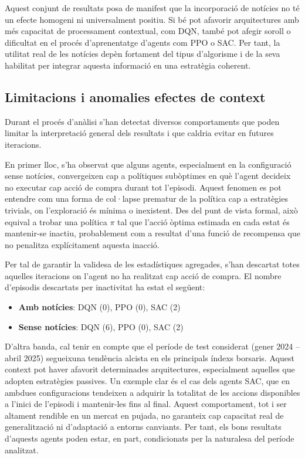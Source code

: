 \documentclass[12pt,a4paper,twoside]{book}
\begin{document}
Aquest conjunt de resultats posa de manifest que la incorporació de notícies no té un efecte homogeni ni universalment positiu. Si bé pot afavorir arquitectures amb més capacitat de processament contextual, com DQN, també pot afegir soroll o dificultat en el procés d’aprenentatge d’agents com PPO o SAC. Per tant, la utilitat real de les notícies depèn fortament del tipus d’algorisme i de la seva habilitat per integrar aquesta informació en una estratègia coherent.

\subsection{Limitacions i anomalies efectes de context}

Durant el procés d’anàlisi s’han detectat diversos comportaments que poden limitar la interpretació general dels resultats i que caldria evitar en futures iteracions.

En primer lloc, s’ha observat que alguns agents, especialment en la configuració sense notícies, convergeixen cap a polítiques subòptimes en què l’agent decideix no executar cap acció de compra durant tot l’episodi. Aquest fenomen es pot entendre com una forma de col·lapse prematur de la política cap a estratègies trivials, on l’exploració és mínima o inexistent. Des del punt de vista formal, això equival a trobar una política \(\pi\) tal que l’acció òptima estimada en cada estat és mantenir-se inactiu, probablement com a resultat d’una funció de recompensa que no penalitza explícitament aquesta inacció.

Per tal de garantir la validesa de les estadístiques agregades, s’han descartat totes aquelles iteracions on l’agent no ha realitzat cap acció de compra. El nombre d’episodis descartats per inactivitat ha estat el següent:

\begin{itemize}
  \item \textbf{Amb notícies}: DQN (0), PPO (0), SAC (2)
  \item \textbf{Sense notícies}: DQN (6), PPO (0), SAC (2)
\end{itemize}

D’altra banda, cal tenir en compte que el període de test considerat (gener 2024 – abril 2025) segueixuna tendència alcista en els principals índexs borsaris. Aquest context pot haver afavorit determinades arquitectures, especialment aquelles que adopten estratègies passives. Un exemple clar és el cas dels agents SAC, que en ambdues configuracions tendeixen a adquirir la totalitat de les accions disponibles a l’inici de l’episodi i mantenir-les fins al final. Aquest comportament, tot i ser altament rendible en un mercat en pujada, no garanteix cap capacitat real de generalització ni d’adaptació a entorns canviants. Per tant, els bons resultats d’aquests agents poden estar, en part, condicionats per la naturalesa del període analitzat.
\end{document}
